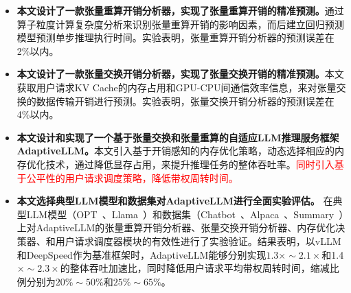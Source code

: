 \begin{itemize}

    \item \textbf{本文设计了一款张量重算开销分析器，实现了张量重算开销的精准预测。}通过算子粒度计算复杂度分析来识别张量重算开销的影响因素，而后建立回归预测模型预测单步推理执行时间。实验表明，张量重算开销分析器的预测误差在2\%以内。
    
    \item \textbf{本文设计了一款张量交换开销分析器，实现了张量交换开销的精准预测。}本文获取用户请求KV Cache的内存占用和GPU-CPU间通信效率信息，来对张量交换的数据传输开销进行预测。实验表明，张量交换开销分析器的预测误差在4\%以内。

    \item \textbf{本文设计和实现了一个基于张量交换和张量重算的自适应LLM推理服务框架AdaptiveLLM。}本文引入基于开销感知的内存优化策略，动态选择相应的内存优化技术，通过降低显存占用，来提升推理任务的整体吞吐率。\textcolor{red}{同时引入基于公平性的用户请求调度策略，降低带权周转时间。}
    
    \item \textbf{本文选择典型LLM模型和数据集对AdaptiveLLM进行全面实验评估。} 在典型LLM模型（OPT~\cite{OPT}、Llama~\cite{Llama}）和数据集（Chatbot~\cite{Chatbot}、Alpaca~\cite{Alpaca}、Summary~\cite{Summary}）上对AdaptiveLLM的张量重算开销分析器、张量交换开销分析器、内存优化决策器、和用户请求调度器模块的有效性进行了实验验证。结果表明，以vLLM和DeepSpeed作为基准框架时，AdaptiveLLM能够分别实现$1.3\times\sim2.1\times$和1.4$\times\sim2.3\times$的整体吞吐加速比，同时降低用户请求平均带权周转时间，缩减比例分别为$20\%\sim50\%$和$25\%\sim65\%$。

\end{itemize}